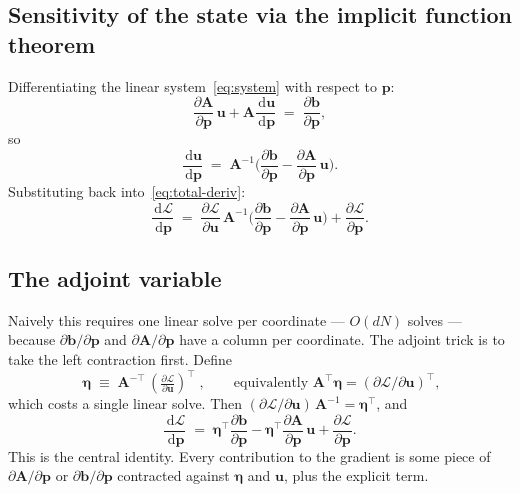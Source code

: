 \documentclass[11pt,a4paper]{article}
\newcommand{\mat}[1]{\mathbf{#1}}
\newcommand{\vect}[1]{\boldsymbol{#1}}
\newcommand{\pts}{\vect{p}}
\newcommand{\dd}{\,\mathrm{d}}
\newcommand{\Loss}{\mathcal{L}}
\begin{document}
\subsection{Sensitivity of the state via the implicit function theorem}

Differentiating the linear system~\eqref{eq:system} with respect to
$\pts$:
\begin{equation}
  \frac{\partial\mat A}{\partial\pts}\,\vect u
  + \mat A \frac{\dd\vect u}{\dd\pts}
  \;=\; \frac{\partial\vect b}{\partial\pts},
\end{equation}
so
\begin{equation}
  \frac{\dd\vect u}{\dd\pts}
  \;=\;
  \mat A^{-1}\Big(\frac{\partial\vect b}{\partial\pts}
                  - \frac{\partial\mat A}{\partial\pts}\,\vect u\Big).
  \label{eq:du-dp}
\end{equation}
Substituting back into~\eqref{eq:total-deriv}:
\begin{equation}
  \frac{\dd\Loss}{\dd\pts}
  \;=\;
  \frac{\partial\Loss}{\partial\vect u}\, \mat A^{-1}
    \Big(\frac{\partial\vect b}{\partial\pts}
        - \frac{\partial\mat A}{\partial\pts}\,\vect u\Big)
  + \frac{\partial\Loss}{\partial\pts}.
\end{equation}

\subsection{The adjoint variable}

Naively this requires one linear solve per coordinate ---
$O(d N)$ solves --- because
$\partial\vect b/\partial\pts$ and $\partial\mat A/\partial\pts$
have a column per coordinate. The adjoint trick is to take the
left contraction first. Define
\begin{equation}
  \boxed{\;\vect\eta
    \;\equiv\; \mat A^{-\top}\,
      \left(\tfrac{\partial\Loss}{\partial\vect u}\right)^{\!\!\top}\;,}
  \qquad
  \text{equivalently } \mat A^\top \vect\eta
    = (\partial\Loss/\partial\vect u)^\top,
  \label{eq:adjoint}
\end{equation}
which costs a single linear solve. Then
$(\partial\Loss/\partial\vect u)\,\mat A^{-1}
= \vect\eta^\top$, and
\begin{equation}
  \boxed{\;
  \frac{\dd\Loss}{\dd\pts}
  \;=\;
  \vect\eta^\top \frac{\partial\vect b}{\partial\pts}
  - \vect\eta^\top \frac{\partial\mat A}{\partial\pts}\,\vect u
  + \frac{\partial\Loss}{\partial\pts}.
  \;}
  \label{eq:dLdp}
\end{equation}
This is the central identity. Every contribution to the gradient is
some piece of $\partial\mat A/\partial\pts$ or
$\partial\vect b/\partial\pts$ contracted against $\vect\eta$ and
$\vect u$, plus the explicit term.
\end{document}
